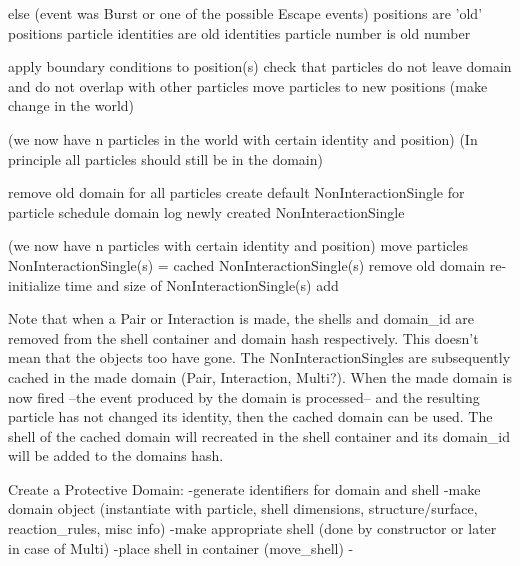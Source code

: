 \documentclass[a4paper, 11pt]{article}
\begin{document}
  else
    (event was Burst or one of the possible Escape events)
    positions are 'old' positions
    particle identities are old identities
    particle number is old number

    apply boundary conditions to position(s)
    check that particles do not leave domain and do not overlap with other particles
    move particles to new positions (make change in the world)

  (we now have n particles in the world with certain identity and position)
  (In principle all particles should still be in the domain)

  remove old domain 
  for all particles
    create default NonInteractionSingle for particle
    schedule domain
    log newly created NonInteractionSingle



    (we now have n particles with certain identity and position)
    move particles
    NonInteractionSingle(s) = cached NonInteractionSingle(s)
    remove old domain
    re-initialize time and size of NonInteractionSingle(s)
    add 




Note that when a Pair or Interaction is made, the shells and domain\_id are removed from the shell container and
domain hash respectively. This doesn't mean that the objects too have gone. The NonInteractionSingles are subsequently
cached in the made domain (Pair, Interaction, Multi?). When the made domain is now fired --the event produced by the
domain is processed-- and the resulting particle has not changed its identity, then the cached domain can be used. The
shell of the cached domain will recreated in the shell container and its domain\_id will be added to the domains hash.



Create a Protective Domain:
-generate identifiers for domain and shell
-make domain object (instantiate with particle, shell dimensions, structure/surface, reaction\_rules, misc info)
 -make appropriate shell (done by constructor or later in case of Multi)
-place shell in container (move\_shell)
-
\end{document}
